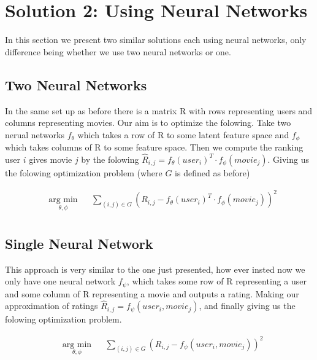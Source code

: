 \documentclass{article}
\begin{document}
\section{Solution 2: Using Neural Networks}

In this section we present two similar solutions each using neural networks, only difference being whether we use two neural networks or one.

\subsection{Two Neural Networks}
In the same set up as before there is a matrix R with rows representing users and columns representing movies. Our aim is to optimize the folowing. Take two nerual networks $f_{\theta}$ which takes a row of R to some latent feature space and $f_{\phi}$ which takes columns of R to some feature space. Then we compute the ranking user $i$ gives movie $j$ by the folowing $\hat{R}_{i,j} = f_{\theta}(user_i)^T \cdot f_{\phi}(movie_j)$. Giving us the folowing optimization problem (where $G$ is defined as before)

\begin{equation*}
\begin{aligned}
& \underset{\theta, \phi}{\text{arg min}}
& & \sum_{(i,j) \in G} (R_{i,j} - f_{\theta}(user_i)^T \cdot f_{\phi}(movie_j))^2  \\
\end{aligned}
\end{equation*}

\subsection{Single Neural Network}
This approach is very similar to the one just presented, how ever insted now we only have one neural network $f_{\psi}$, which takes some row of R representing a user and some column of R representing a movie and outputs a rating. Making our approximation of ratings $\hat{R}_{i,j} = f_{\psi}(user_i, movie_j)$, and finally giving us the folowing optimization problem.

\begin{equation*}
\begin{aligned}
& \underset{\theta, \phi}{\text{arg min}}
& & \sum_{(i,j) \in G} (R_{i,j} - f_{\psi}(user_i, movie_j))^2  \\
\end{aligned}
\end{equation*}
\end{document}
